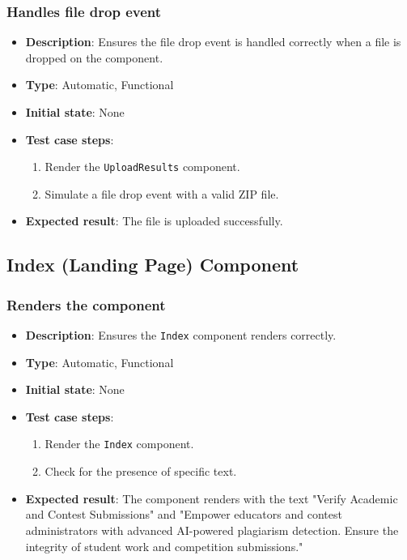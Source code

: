 \documentclass[12pt, titlepage]{article}
\begin{document}
\subsubsection{Handles file drop event}
\begin{itemize}
    \item \textbf{Description}: Ensures the file drop event is handled correctly when a file is dropped on the component.
    \item \textbf{Type}: Automatic, Functional
    \item \textbf{Initial state}: None
    \item \textbf{Test case steps}:
    \begin{enumerate}
        \item Render the \texttt{UploadResults} component.
        \item Simulate a file drop event with a valid ZIP file.
    \end{enumerate}
    \item \textbf{Expected result}: The file is uploaded successfully.
\end{itemize}

\subsection{Index (Landing Page) Component}

\subsubsection{Renders the component}
\begin{itemize}
    \item \textbf{Description}: Ensures the \texttt{Index} component renders correctly.
    \item \textbf{Type}: Automatic, Functional
    \item \textbf{Initial state}: None
    \item \textbf{Test case steps}:
    \begin{enumerate}
        \item Render the \texttt{Index} component.
        \item Check for the presence of specific text.
    \end{enumerate}
    \item \textbf{Expected result}: The component renders with the text "Verify Academic and Contest Submissions" and "Empower educators and contest administrators with advanced AI-powered plagiarism detection. Ensure the integrity of student work and competition submissions."
\end{itemize}
\end{document}
